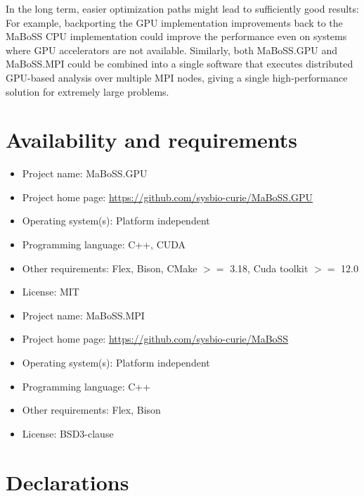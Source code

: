 \documentclass[sn-mathphys-num]{sn-jnl}%
\begin{document}
In the long term, easier optimization paths might lead to sufficiently good results: For example, backporting the GPU implementation improvements back to the MaBoSS CPU implementation could improve the performance even on systems where GPU accelerators are not available. Similarly, both MaBoSS.GPU and MaBoSS.MPI could be combined into a single software that executes distributed GPU-based analysis over multiple MPI nodes, giving a single high-performance solution for extremely large problems.

\section*{Availability and requirements}
\begin{itemize}
	\item Project name: MaBoSS.GPU
	\item Project home page: \url{https://github.com/sysbio-curie/MaBoSS.GPU}
	\item Operating system(s): Platform independent
	\item Programming language: C++, CUDA
	\item Other requirements: Flex, Bison, CMake $>=$ 3.18, Cuda toolkit $>=$ 12.0
	\item License: MIT
\end{itemize}

\begin{itemize}
	\item Project name: MaBoSS.MPI
	\item Project home page: \url{https://github.com/sysbio-curie/MaBoSS}
	\item Operating system(s): Platform independent
	\item Programming language: C++
	\item Other requirements: Flex, Bison
	\item License: BSD3-clause
\end{itemize}


\backmatter

\section*{Declarations}

\end{document}
